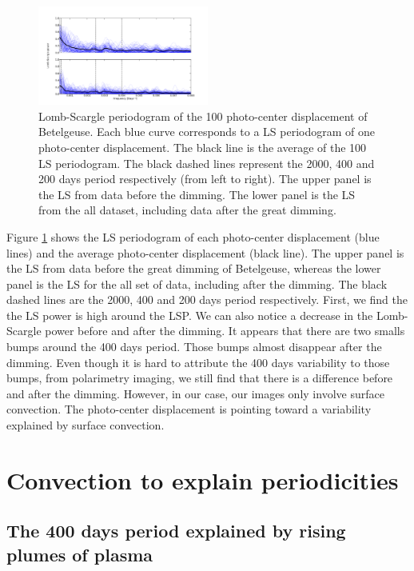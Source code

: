 \documentclass{aa}
\begin{document}
\begin{figure}[!h]
    \centering
    \includegraphics[width=0.5\textwidth]{Lomb-Scargle Photo-center.png}
    \caption{Lomb-Scargle periodogram of the 100 photo-center displacement of Betelgeuse. Each blue curve corresponds to a LS periodogram of one photo-center
     displacement. The black line is the average of the 100 LS periodogram. The black dashed lines represent the 2000, 400 and 200 days period respectively 
     (from left to right). The upper panel is the LS from data before the dimming. The lower panel is the LS from the all dataset, 
     including data after the great dimming. }
    \label{LS photocenter}
\end{figure}

Figure \ref{LS photocenter} shows the LS periodogram of each photo-center displacement (blue lines) and the average photo-center displacement (black line). 
The upper panel is the LS from data before the great dimming of Betelgeuse, whereas the lower panel is the LS for the all set of data, 
including after the dimming. The black dashed lines are the 2000, 400 and 200 days period respectively. First, we find the the LS power is high around the LSP.
We can also notice a decrease in the Lomb-Scargle power before and after the dimming. It appears that there are two smalls bumps around the 400 days period. 
Those bumps almost disappear after the dimming. Even though it is hard to attribute the 400 days variability to those bumps, from polarimetry imaging,
we still find that there is a difference before and after the dimming. However, in our case, our images only involve surface convection.
The photo-center displacement is pointing toward a variability explained by surface convection. 




\section{Convection to explain periodicities}

\subsection{The 400 days period explained by rising plumes of plasma}
\end{document}
